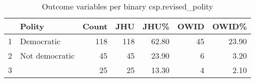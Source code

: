 \begin{table}[ht]
\centering
\caption{Outcome variables per binary csp.revised\_polity} 
\begingroup\footnotesize
\begin{tabular}{rlrrrrr}
  \hline
 & Polity & Count & JHU & JHU\% & OWID & OWID\% \\ 
  \hline
1 & Democratic & 118 & 118 & 62.80 &  45 & 23.90 \\ 
  2 & Not democratic &  45 &  45 & 23.90 &   6 & 3.20 \\ 
  3 &  &  25 &  25 & 13.30 &   4 & 2.10 \\ 
   \hline
\end{tabular}
\endgroup
\end{table}
